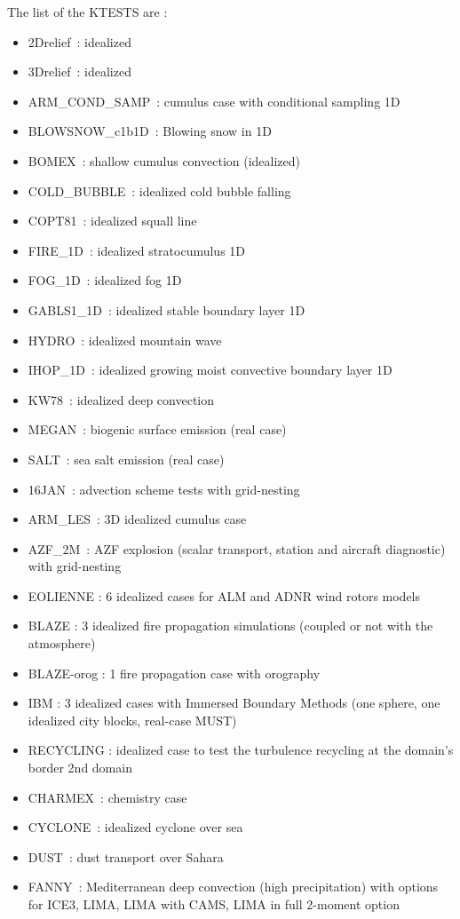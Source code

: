 The list of the KTESTS are :
\begin{itemize}
    \item 2Drelief : idealized
   \item3Drelief : idealized
   \item ARM\_COND\_SAMP : cumulus case with conditional sampling 1D
   \item BLOWSNOW\_c1b1D : Blowing snow in 1D
   \item BOMEX : shallow cumulus convection (idealized)
   \item COLD\_BUBBLE : idealized cold bubble falling 
   \item COPT81 : idealized squall line
   \item FIRE\_1D : idealized stratocumulus 1D
   \item FOG\_1D : idealized fog 1D
   \item GABLS1\_1D : idealized stable boundary layer 1D
   \item HYDRO : idealized mountain wave
   \item IHOP\_1D : idealized growing moist convective boundary layer 1D
   \item KW78 : idealized deep convection
   \item MEGAN : biogenic surface emission (real case)
   \item SALT : sea salt emission (real case)
  \item  16JAN : advection scheme tests with grid-nesting
\item  ARM\_LES : 3D idealized cumulus case
\item AZF\_2M : AZF explosion (scalar transport, station and aircraft diagnostic) with grid-nesting
\item EOLIENNE : 6 idealized cases for ALM and ADNR wind rotors models
\item BLAZE : 3 idealized fire propagation simulations (coupled or not with the atmosphere)
\item BLAZE-orog : 1 fire propagation case with orography
\item IBM : 3 idealized cases with Immersed Boundary Methods (one sphere, one idealized city blocks, real-case MUST)
\item RECYCLING : idealized case to test the turbulence recycling at the domain's border 2nd domain
\item CHARMEX : chemistry case 
\item CYCLONE : idealized cyclone over sea
\item DUST : dust transport over Sahara
\item FANNY : Mediterranean deep convection (high precipitation) with options for ICE3, LIMA, LIMA with CAMS, LIMA in full 2-moment option

\end{itemize}
